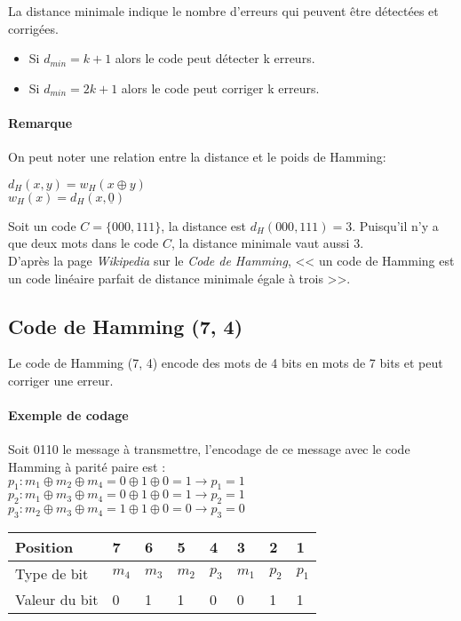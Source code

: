 \documentclass[a4paper, 12pt]{article}
\begin{document}
	La distance minimale indique le nombre d'erreurs qui peuvent être détectées et corrigées.
	\begin{itemize}
		\item Si $d_{min} = k + 1$ alors le code peut détecter k erreurs.
		\item Si $d_{min} = 2k + 1 $ alors le code peut corriger k erreurs.\\
	\end{itemize}

	\paragraph{Remarque} On peut noter une relation entre la distance et le poids de Hamming:
	\begin{center}
		$d_H (x, y) = w_H(x \oplus y) $ \\
		$w_H(x) = d_H (x, \underline{0} ) $
	\end{center}
	Soit un  code $C = \{000, 111\}$, la distance est $d_H(000, 111) = 3$.
	Puisqu’il n’y a que deux mots dans le code $C$, la distance minimale vaut aussi 3.\\

	D'après la page \textit{Wikipedia} sur le \textit{Code de Hamming}, << un code de Hamming est un code linéaire parfait de distance minimale égale à trois >>. \\


	\subsection{Code de Hamming (7, 4)}
	Le code de Hamming (7, 4) encode des mots de 4 bits en mots de 7 bits et peut corriger une erreur.

	\paragraph{Exemple de codage}
	Soit 0110 le message à transmettre, l’encodage de ce message avec le code Hamming à parité paire est : \\
	$p_{1} : m_{1} \oplus m_{2} \oplus m_{4} = 0 \oplus 1 \oplus 0 = 1 \rightarrow p_{1} = 1$ \\
	$p_{2} : m_{1} \oplus m_{3} \oplus m_{4} = 0 \oplus 1 \oplus 0 = 1 \rightarrow p_{2} = 1$ \\
	$p_{3} : m_{2} \oplus m_{3} \oplus m_{4} = 1 \oplus 1 \oplus 0 = 0 \rightarrow p_{3} = 0$

	\begin{center}
		\begin{tabular}{|m{3cm}<{\centering}|m{1.2cm}<{\centering}|m{1.2cm}<{\centering}|m{1.2cm}<{\centering}|m{1.2cm}<{\centering}|m{1.2cm}<{\centering}|m{1.2cm}<{\centering}|m{1.2cm}<{\centering}|}
			\hline
			Position & 7 & 6 & 5 & 4 & 3 & 2 & 1 \\
			\hline
			Type de bit & $m_{4}$ & $m_{3}$ & $m_{2}$ & $p_{3}$ & $m_{1}$ & $p_{2}$ & $p_{1}$ \\
			\hline
			Valeur du bit & 0 & 1 & 1 & 0 & 0 & 1 & 1 \\
			\hline
		\end{tabular}
	\end{center}
\end{document}
